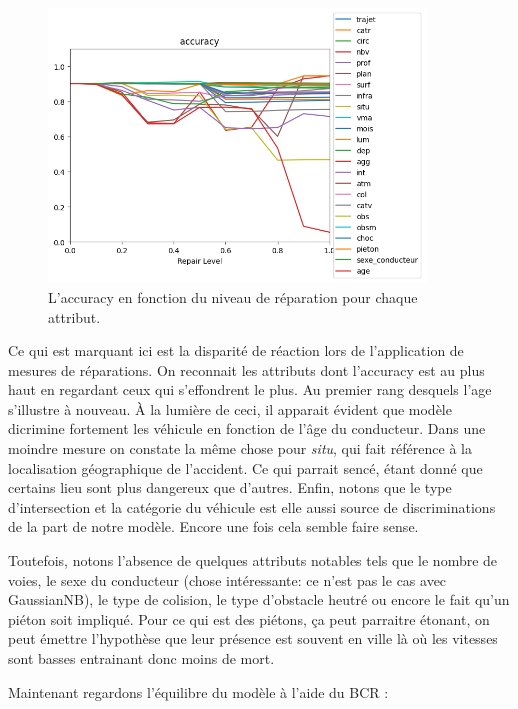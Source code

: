 \documentclass{article}
\begin{document}
    \begin{figure}[h]
        \centering
        \includegraphics[width=10cm]{./img/accuracy.png}
        \caption{L'accuracy en fonction du niveau de réparation pour chaque attribut.}
    \end{figure}

    Ce qui est marquant ici est la disparité de réaction lors de l'application de mesures de réparations. On reconnait les 
    attributs dont l'accuracy est au plus haut en regardant ceux qui s'effondrent le plus. Au premier rang desquels l'age s'illustre
    à nouveau. À la lumière de ceci, il apparait évident que modèle dicrimine fortement les véhicule en fonction de l'âge du 
    conducteur. Dans une moindre mesure on constate la même chose pour \textit{situ}, qui fait référence à la localisation 
    géographique de l'accident. Ce qui parrait sencé, étant donné que certains lieu sont plus dangereux que d'autres. Enfin, 
    notons que le type d'intersection et la catégorie du véhicule est elle aussi source de discriminations de la part de notre 
    modèle. Encore une fois cela semble faire sense.

    Toutefois, notons l'absence de quelques attributs notables tels que le nombre de voies, le sexe du conducteur (chose intéressante:
    ce n'est pas le cas avec GaussianNB),  le type de colision, le type d'obstacle heutré ou encore le fait qu'un piéton soit impliqué.
    Pour ce qui est des piétons, ça peut parraitre étonant, on peut émettre l'hypothèse que leur présence est souvent en ville là où 
    les vitesses sont basses entrainant donc moins de mort.

    Maintenant regardons l'équilibre du modèle à l'aide du BCR : 
\end{document}
